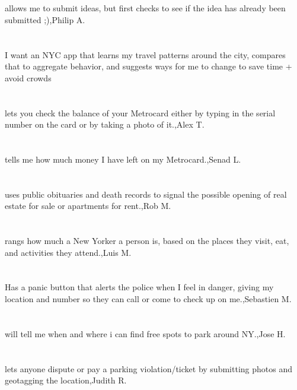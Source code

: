 \section{}allows me to submit ideas, but first checks to see if the idea has already been submitted ;),Philip A.
\section{}  I want an NYC app that learns my travel patterns around the city, compares that to aggregate behavior, and suggests ways for me to change to save time + avoid crowds
\section{}lets you check the balance of your Metrocard either by typing in the serial number on the card or by taking a photo of it.,Alex T.
\section{}tells me how much money I have left on my Metrocard.,Senad L.
\section{}uses public obituaries and death records to signal the possible opening of real estate for sale or apartments for rent.,Rob M.
\section{} rangs how much a New Yorker a person is, based on the places they visit, eat, and activities they attend.,Luis M.
\section{}Has a panic button that alerts the police when I feel in danger, giving my location and number so they can call or come to check up on me.,Sebastien M.
\section{}will tell me when and where i can find free spots to park around NY.,Jose H.
\section{}lets anyone dispute or pay a parking violation/ticket by submitting photos and geotagging the location,Judith R.
